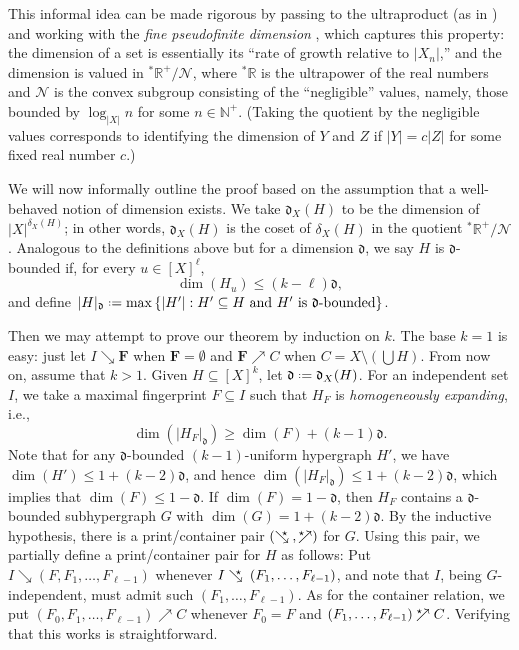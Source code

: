 \documentclass[12pt,reqno]{amsart}
\theoremstyle{plain}
\theoremstyle{definition}
\theoremstyle{remark}
\newcommand{\0}{\mathbb{\emptyset}}
\newcommand{\N}{\mathbb{N}}
\newcommand{\sR}{{}^\ast\mathbb{R}}
\newcommand{\set}[1]{\left\{ #1 \right\}}
\newcommand*{\defeq}{\mathrel{\vcenter{\baselineskip0.5ex \lineskiplimit0pt \hbox{\scriptsize.}\hbox{\scriptsize.}}}=}
\newcommand{\dF}{\mathfrak{d}}
\newcommand{\Print}{\boldsymbol{F}}
\newcommand{\prel}{\searrow}
\newcommand{\crel}{\nearrow}
\newcommand{\prelG}[1]{\mathrel{\;\:\mathclap{\searrow}{{}^{#1}}\;}}
\newcommand{\crelG}[1]{\mathrel{{}^{#1}\mathclap{\nearrow}{\;\:}}}
\begin{document}
This informal idea can be made rigorous by passing to the ultraproduct (as in \cite{arXiv1709.04076, MR1643950}) and working with the \emph{fine pseudofinite dimension} \cite{hrushovski,MR3091666, MR2436141, 2014arXiv1402.5212G}, which captures this property: the dimension of a set is essentially its ``rate of growth relative to $|X_n|$,'' and the dimension is valued in $\sR^+/\mathcal{N}$, where $\sR$ is the ultrapower of the real numbers and $\mathcal{N}$ is the convex subgroup consisting of the ``negligible'' values, namely, those bounded by $\log_{|X|} n$ for some $n \in \N^+$. (Taking the quotient by the negligible values corresponds to identifying the dimension of $Y$ and $Z$ if $|Y| = c|Z|$ for some fixed real number $c$.)

We will now informally outline the proof based on the assumption that a well-behaved notion of dimension exists. We take $\dF_X(H)$ to be the dimension of $|X|^{\delta_X(H)}$; in other words, $\dF_X(H)$ is the coset of $\delta_X(H)$ in the quotient $\sR^+/\mathcal{N}$. Analogous to the definitions above but for a dimension $\dF$, we say $H$ is $\dF$-bounded if, for every $u \in [X]^\ell$,
\[
\dim(H_u) \leq (k - \ell) \dF,
\]
and define $|H|_\dF \defeq \max\set{|H'| : H' \subseteq H \text{ and }H'\text{ is } \dF\text{-bounded}}$.

Then we may attempt to prove our theorem by induction on $k$. The base $k=1$ is easy: just let $I \prel \Print$ when $\Print = \0$ and $\Print \crel C$ when $C = X \setminus \left(\bigcup H\right)$. From now on, assume that $k > 1$. Given $H \subseteq [X]^k$, let $\dF \defeq \dF_X(H)$. For an independent set $I$, we take a maximal fingerprint $F \subseteq I$ such that $H_F$ is \emph{homogeneously expanding}, i.e., 
\[
\dim(|H_F|_{\dF})\geq \dim(F)+(k-1)\dF.
\]
Note that for any $\dF$-bounded $(k-1)$-uniform hypergraph $H'$, we have $\dim(H') \leq 1 + (k-2) \dF$, and hence $\dim(|H_F|_{\dF})\leq 1+(k-2)\dF$, which implies that $\dim(F) \leq 1 - \dF$. If $\dim(F)=1-\dF$, then $H_F$ contains a $\dF$-bounded subhypergraph $G$ with $\dim(G) = 1 + (k-2) \dF$. By the inductive hypothesis, there is a print/container pair $\left(\prelG{\star},\crelG{\star}\right)$ for $G$. Using this pair, we partially define a print/container pair for
$H$ as follows: Put $I \prel (F, F_1, \ldots, F_{\ell-1})$ whenever $I \prelG{\star} (F_1, \ldots, F_{\ell-1})$, and note that $I$, being $G$-independent, must admit such $(F_1, \ldots, F_{\ell-1})$. As for the container relation, we put $(F_0, F_1, \ldots, F_{\ell-1}) \crel C$ whenever $F_0 = F$ and $(F_1, \ldots, F_{\ell-1}) \crelG{\star} C$. Verifying that this works is straightforward.
\end{document}
